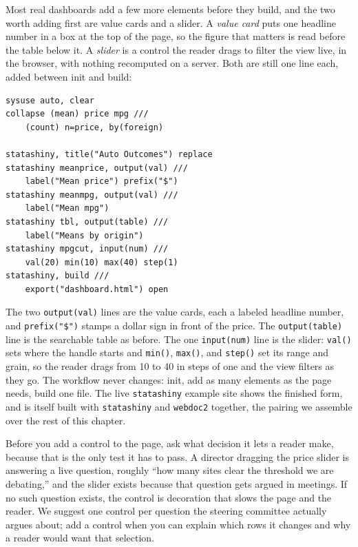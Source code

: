 Most real dashboards add a few more elements before they build, and the two worth adding first are value cards and a slider. A \emph{value card} puts one headline number in a box at the top of the page, so the figure that matters is read before the table below it. A \emph{slider} is a control the reader drags to filter the view live, in the browser, with nothing recomputed on a server. Both are still one line each, added between init and build:
\par
{\footnotesize
\begin{verbatim}
sysuse auto, clear
collapse (mean) price mpg ///
    (count) n=price, by(foreign)

statashiny, title("Auto Outcomes") replace
statashiny meanprice, output(val) ///
    label("Mean price") prefix("$")
statashiny meanmpg, output(val) ///
    label("Mean mpg")
statashiny tbl, output(table) ///
    label("Means by origin")
statashiny mpgcut, input(num) ///
    val(20) min(10) max(40) step(1)
statashiny, build ///
    export("dashboard.html") open
\end{verbatim}
}
The two \texttt{output(val)} lines are the value cards, each a labeled headline number, and \texttt{prefix("\$")} stamps a dollar sign in front of the price. The \texttt{output(table)} line is the searchable table as before. The one \texttt{input(num)} line is the slider: \texttt{val()} sets where the handle starts and \texttt{min()}, \texttt{max()}, and \texttt{step()} set its range and grain, so the reader drags from 10 to 40 in steps of one and the view filters as they go. The workflow never changes: init, add as many elements as the page needs, build one file. The live \texttt{statashiny} example site shows the finished form, and is itself built with \texttt{statashiny} and \texttt{webdoc2} together, the pairing we assemble over the rest of this chapter.

Before you add a control to the page, ask what decision it lets a reader make, because that is the only test it has to pass. A director dragging the price slider is answering a live question, roughly \enquote{how many sites clear the threshold we are debating,} and the slider exists because that question gets argued in meetings. If no such question exists, the control is decoration that slows the page and the reader. We suggest one control per question the steering committee actually argues about; add a control when you can explain which rows it changes and why a reader would want that selection.


